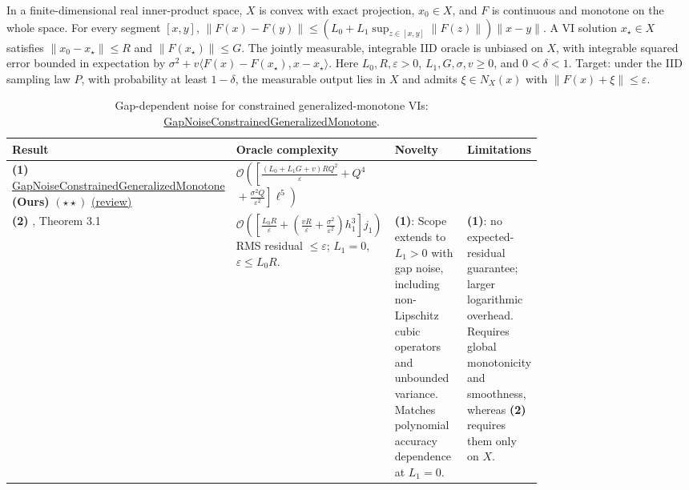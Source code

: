\begin{table}[tp]
\centering
\caption{Gap-dependent noise for constrained generalized-monotone VIs: \href{https://github.com/k3nfalt/longtails/blob/main/LongTails/Setups/GapNoiseConstrainedGeneralizedMonotone.lean}{GapNoiseConstrainedGeneralizedMonotone}.}\label{tab:GapNoiseConstrainedGeneralizedMonotone}
\parbox{\linewidth}{\footnotesize In a finite-dimensional real inner-product space, $X$ is convex with exact projection, $x_0\in X$, and $F$ is continuous and monotone on the whole space. For every segment $[x,y]$, $\|F(x)-F(y)\|\le (L_0+L_1\sup_{z\in[x,y]}\|F(z)\|)\|x-y\|$. A VI solution $x_\star\in X$ satisfies $\|x_0-x_\star\|\le R$ and $\|F(x_\star)\|\le G$. The jointly measurable, integrable IID oracle is unbiased on $X$, with integrable squared error bounded in expectation by $\sigma^2+v\langle F(x)-F(x_\star),x-x_\star\rangle$. Here $L_0,R,\varepsilon>0$, $L_1,G,\sigma,v\ge0$, and $0<\delta<1$. Target: under the IID sampling law $P$, with probability at least $1-\delta$, the measurable output lies in $X$ and admits $\xi\in N_X(x)$ with $\|F(x)+\xi\|\le\varepsilon$.}\par\smallskip
\begin{threeparttable}
\footnotesize
\setlength{\tabcolsep}{4pt}\renewcommand{\arraystretch}{1.25}
\begin{tabularx}{\linewidth}{@{}>{\raggedright\arraybackslash}p{0.20\linewidth}>{\raggedright\arraybackslash}p{0.32\linewidth}>{\raggedright\arraybackslash}p{0.25\linewidth}>{\raggedright\arraybackslash}X@{}}
\toprule
\textbf{Result} & \textbf{Oracle complexity} & \textbf{Novelty} & \textbf{Limitations} \\
\midrule
\textbf{(1)} \href{https://github.com/k3nfalt/longtails/blob/main/LongTails/Theorems/GapNoiseConstrainedGeneralizedMonotone.lean}{Gap\allowbreak Noise\allowbreak Constrained\allowbreak Generalized\allowbreak Monotone} \textbf{(Ours)} $(\star\star)$ \href{https://github.com/k3nfalt/longtails/blob/main/scripts/reviews/GapNoiseConstrainedGeneralizedMonotone.md}{(review)} & $\mathcal{O}\!\left(\left[\frac{(L_0+L_1G+v)RQ^2}{\varepsilon}+Q^4\right.\right.$\newline $\left.\left.{}+\frac{\sigma^2Q}{\varepsilon^2}\right]\ell^5\right)$ & & \\
\midrule[1.2pt]
\textbf{(2)} \citep{gnJiLanZhuV2}, Theorem 3.1 & $\mathcal{O}\!\left(\left[\frac{L_0R}{\varepsilon}+\left(\frac{vR}{\varepsilon}+\frac{\sigma^2}{\varepsilon^2}\right)h_1^3\right]j_1\right)$\newline RMS residual $\le\varepsilon$; $L_1=0$, $\varepsilon\le L_0R$. & \textbf{(1)}: Scope extends to $L_1>0$ with gap noise, including non-Lipschitz cubic operators and unbounded variance. Matches polynomial accuracy dependence at $L_1=0$. & \textbf{(1)}: no expected-residual guarantee; larger logarithmic overhead. Requires global monotonicity and smoothness, whereas \textbf{(2)} requires them only on $X$. \\

\end{tabularx}
\end{threeparttable}
\end{table}
